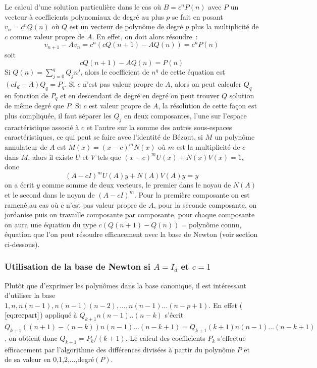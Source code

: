 \documentclass[a4paper,11pt]{article}
\begin{document}
\begin{giacjshere}
Le calcul d'une solution particulière dans le cas où 
$B=c^n P(n)$ avec $P$ un vecteur à coefficients polynomiaux
de degré au plus $p$ se fait en posant $v_n=c^n Q(n)$
où $Q$ est un vecteur de polynôme de degré $p$ plus la multiplicité
de $c$ comme valeur propre de $A$. En effet, on doit alors résoudre~:
$$v_{n+1}-Av_n = c^n (c Q(n+1)- AQ(n)) = c^n P(n)  $$
soit
\begin{equation} \label{eq:recpart}
c Q(n+1)- AQ(n) = P(n)
\end{equation}
Si $Q(n)=\sum_{j=0}^q Q_j n^j$, alors le coefficient de $n^q$ de cette équation
est $(c I_d -A)Q_q=P_q$. Si $c$ n'est pas valeur propre de $A$, alors
on peut calculer $Q_q$ en fonction de $P_q$ et en descendant de degré en degré
on peut trouver $Q$ solution de même degré que $P$. Si $c$ est valeur
propre de $A$, la résolution de cette façon
est plus compliquée, il faut séparer les
$Q_j$ en deux composantes, l'une sur l'espace caractéristique associé
à $c$ et l'autre sur la somme des autres sous-espaces caractéristiques,
ce qui peut se faire avec l'identité de Bézout, si $M$ un polynôme annulateur
de $A$ est $M(x)=(x-c)^m N(x)$ où $m$ est la multiplicité de $c$ dans $M$,
alors il existe $U$ et $V$ tels que $(x-c)^mU(x)+N(x)V(x)=1$, donc
\[ (A-cI)^m U(A)y+N(A)V(A)y= y\]
on a écrit $y$ comme somme de deux vecteurs, le premier dans le noyau de
$N(A)$ et le second dans le noyau de $(A-cI)^m$. Pour la première
composante on est ramené au cas où $c$ n'est pas valeur propre de $A$,
pour la seconde composante, on jordanise puis on travaille composante
par composante, pour chaque composante on aura une équation du type
$c(Q(n+1)-Q(n))=$polynôme connu, équation 
que l'on peut résoudre efficacement avec
la base de Newton (voir section ci-dessous).

\subsubsection{Utilisation de la base de Newton si $A=I_d$ et $c=1$}
Plutôt que d'exprimer les polynômes dans la base canonique, il est
intéressant d'utiliser la base $1,n,n(n-1),n(n-1)(n-2),...,n(n-1)...(n-p+1)$.
En effet (\(\ref{eq:recpart}\)) appliqué à $Q_{k+1} n(n-1)..(n-k)$ s'écrit
$Q_{k+1}((n+1)-(n-k))n(n-1)...(n-k+1)=Q_{k+1}(k+1)n(n-1)...(n-k+1)$, on obtient
donc $Q_{k+1}=P_{k}/(k+1)$. Le calcul des coefficients $P_k$ s'effectue
efficacement par l'algorithme des différences divisées à partir
du polynôme $P$ et de sa valeur en 0,1,2,...,degré$(P)$.


\end{giacjshere}
\end{document}
